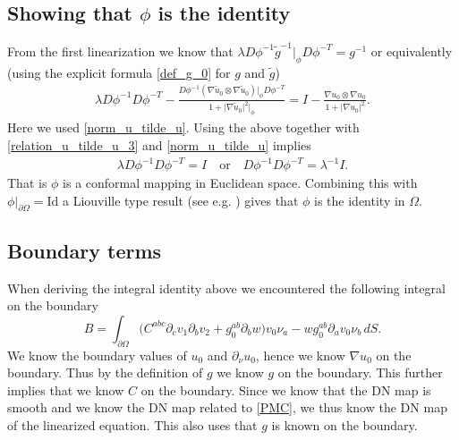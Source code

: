 \documentclass[a4paper, 10pt, twoside, notitlepage]{amsart}
\theoremstyle{plain}
\newcommand{\Om}{\Omega}
\numberwithin{equation}{section}
\newcommand {\p} {\partial}
\newcommand{\abs}[1]{\lvert #1 \rvert}
\begin{document}
%

\subsection{Showing that $\phi$ is the identity}\label{sub_sec_phi_identity}

From the first linearization we know that $\lambda D\phi^{-1}\tilde g^{-1}|_{\phi}D\phi^{-T}=g^{-1}$ or equivalently (using the explicit formula \eqref{def_g_0} for $g$ and $\tilde g$)
\begin{align*}
	\lambda D\phi^{-1}D\phi^{-T} - \frac{D\phi^{-1}(\nabla \tilde u_0\otimes\nabla \tilde u_0)|_{\phi}D\phi^{-T}}{1+\abs{\nabla\tilde u_0}^2|_{\phi}} = I - \frac{\nabla u_0\otimes \nabla u_0}{1+\abs{\nabla u_0}^2}.
\end{align*}
Here we used \eqref{norm_u_tilde_u}. Using the above together with \eqref{relation_u_tilde_u_3} and \eqref{norm_u_tilde_u} implies
\begin{align*}
	\lambda D\phi^{-1}D\phi^{-T} = I \quad \text{or}\quad D\phi^{-1}D\phi^{-T}=\lambda^{-1}I.
\end{align*}
That is $\phi$ is a conformal mapping in Euclidean space. 
Combining this with $\phi|_{\p\Om}=\mathrm{Id}$ a Liouville type result (see e.g. \cite[Proposition 3.3.]{Lionheart_1997}) gives that $\phi$ is the identity in $\Om$.


\subsection{Boundary terms}

When deriving the integral identity above we encountered the following integral on the boundary
\begin{equation*}
	B = \int_{\p\Om} \big(C^{abc}\p_cv_1\p_bv_2 + g_0^{ab}\p_bw\big) v_0\nu_a - wg_0^{ab}\p_a v_0\nu_b\,dS.
\end{equation*}
We know the boundary values of $u_0$ and $\p_{\nu}u_0$, hence we know $\nabla u_0$ on the boundary. Thus by the definition of $g$ we know $g$ on the boundary. This further implies that we know $C$ on the boundary. Since we know that the DN map is smooth and we know the DN map related to \eqref{PMC}, we thus know the DN map of the linearized equation. This also uses that $g$ is known on the boundary.
\end{document}
